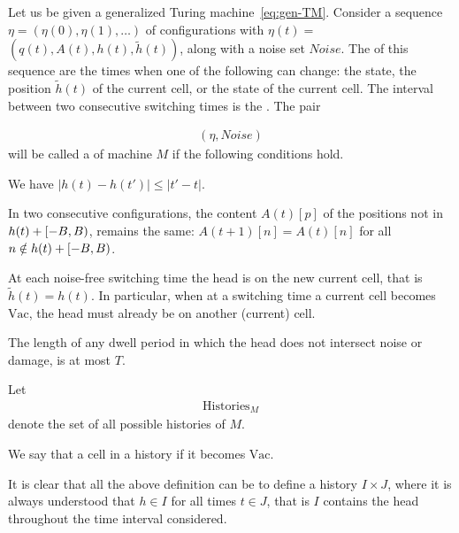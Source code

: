 \documentclass[12pt]{memoir}
\renewcommand{\le}{\leq}
\def\B{B}
\newcommand{\h}{h}
\newcommand{\hc}{\tilde h}
\newcommand{\Noise}{\mathit{Noise}}
\newcommand{\Tu}{T}
\newcommand{\Histories}{\mathrm{Histories}}
\newcommand{\Vacant}{\mathrm{Vac}}
\begin{document}
\begin{definition}[History]\label{def:history}
  \begin{sloppypar}
    Let us be given a generalized Turing machine~\eqref{eq:gen-TM}.
    Consider a sequence \( \eta = (\eta(0), \eta(1), \dots) \) of configurations with
    \( \eta(t) = \) \( (q(t), A(t), \h(t), \hc(t)) \), along with a noise set \( \Noise \).
    The  of this sequence 
are the times when one of the following can change:
the state, the position \( \hc(t) \) of the current cell, or the state of the current cell.
The interval between two consecutive switching times is the .
The pair
      \end{sloppypar}
    \begin{align*}
       (\eta,\Noise)
    \end{align*}
    will be called a  of machine \( M \) if the following conditions hold.
        \begin{bullets}
            \item We have \( |\h(t) - \h(t')| \le |t' - t| \).

            \item In two consecutive configurations, the content \( A(t)[p] \) of the positions not in
                  \( \h(t) + \lint{-\B}{\B} \), remains the same:
                  \( A(t+1)[n] = A(t)[n] \) for all \( n \notin \h(t) + \lint{-\B}{\B} \).

            \item At each noise-free switching time the head is on the new current cell, that is
\( \hc(t)=\h(t) \).
In particular, when at a switching time a current cell becomes
\( \Vacant \), the head must already be on another (current) cell.

            \item The length of any dwell period in which the head does not intersect
noise or damage, is at most \( \Tu \).

        \end{bullets}
    Let
        \begin{align*}
            \Histories_{M}
        \end{align*}
    denote the set of all possible histories of \( M \).

We say that a cell  in a history if it becomes \( \Vacant \).

It is clear that all the above definition can be  to define a history
 \( I\times J \), 
where it is always understood that \( \h\in I \) for all times \( t\in J \),
that is \( I \) contains the head throughout the time interval considered.

\end{definition}
\end{document}

